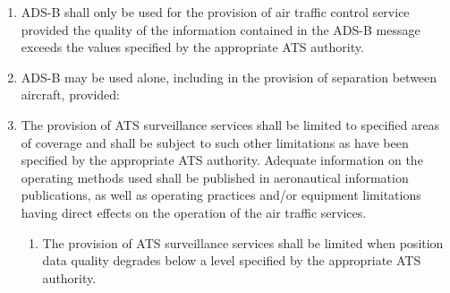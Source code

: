 \documentclass[../main.tex]{subfiles}
\begin{document}
\begin{enumerate}[label=\arabic{section}.\arabic{subsection}.\arabic*]

        \item ADS-B shall only be used for the provision of air traffic control service provided the quality of the information contained in the ADS-B message exceeds the values specified by the appropriate ATS authority.
        \item ADS-B may be used alone, including in the provision of separation between aircraft, provided:


        \item The provision of ATS surveillance services shall be limited to specified areas of coverage and shall be subject to such other limitations as have been specified by the appropriate ATS authority. Adequate information on the operating methods used shall be published in aeronautical information publications, as well as operating practices and/or equipment limitations having direct effects on the operation of the air traffic services.


        \begin{enumerate}[label=\arabic{section}.\arabic{subsection}.\arabic{enumi}.\arabic*]
            \item The provision of ATS surveillance services shall be limited when position data quality degrades below a level specified by the appropriate ATS authority.
        \end{enumerate}


\end{enumerate}
\end{document}
